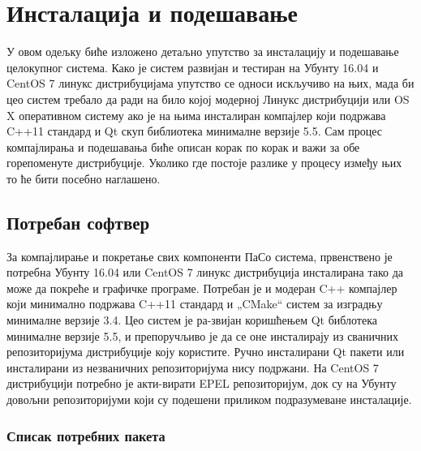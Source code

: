 \documentclass[a4paper, 12pt, diplomski]{etfcyr}
\def\quote#1{„#1“}
\begin{document}
	\chapter{Инсталација и подешавање}
		\begin{justify}
			У овом одељку биће изложено детаљно упутство за инсталацију и подешавање целокупног система. Како је систем развијан и тестиран на Убунту 16.04 и CentOS 7 линукс дистрибуцијама упутство се односи искључиво на њих, мада би цео систем требало да ради на било којој модерној Линукс дистрибуцији или OS X оперативном систему ако је на њима инсталиран компајлер који подржава C++11 стандард и Qt скуп библиотека минималне верзије 5.5.
			Сам процес компајлирања и подешавања биће описан корак по корак и важи за обе горепоменуте дистрибуције. Уколико где постоје разлике у процесу између њих то ће бити посебно наглашено.
		\end{justify}

		\section{Потребан софтвер}
			\begin{justify}
				За компајлирање и покретање свих компоненти ПаСо система, првенствено је потребна Убунту 16.04 или CentOS 7 линукс дистрибуција инсталирана тако да може да покреће и графичке програме. Потребан је и модеран C++ компајлер који минимално подржава C++11 стандард и \quote{CMake} систем за изградњу минималне верзије 3.4. Цео систем је ра-звијан коришћењем Qt библотека минималне верзије 5.5, и препоручљиво је да се оне инсталирају из сваничних репозиторијума дистрибуције коју користите. Ручно инсталирани Qt пакети или инсталирани из незваничних репозиторијума нису подржани. На CentOS 7 дистрибуцији потребно је акти-вирати EPEL репозиторијум, док су на Убунту довољни репозиторијуми који су подешени приликом подразумеване инсталације.
			\end{justify}

			\newpage

			\subsection{Списак потребних пакета}
\end{document}
